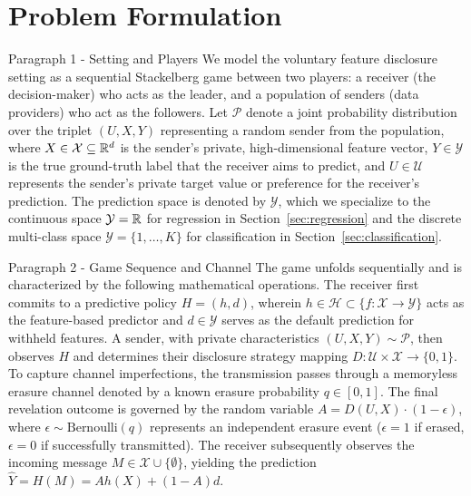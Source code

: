 \section{Problem Formulation}
\label{sec:formulation}

\begin{sourceblock}{Paragraph 1 - Setting and Players}
We model the voluntary feature disclosure setting as a sequential Stackelberg game between two players: a receiver (the decision-maker) who acts as the leader, and a population of senders (data providers) who act as the followers. Let $\mathcal{P}$ denote a joint probability distribution over the triplet $(U, X, Y)$ representing a random sender from the population, where $X \in \mathcal{X} \subseteq \mathbb{R}^d$ is the sender's private, high-dimensional feature vector, $Y \in \mathcal{Y}$ is the true ground-truth label that the receiver aims to predict, and $U \in \mathcal{U}$ represents the sender's private target value or preference for the receiver's prediction. The prediction space is denoted by $\mathcal{Y}$, which we specialize to the continuous space $\mathcal{Y} = \mathbb{R}$ for regression in Section~\ref{sec:regression} and the discrete multi-class space $\mathcal{Y} = \{1, \dots, K\}$ for classification in Section~\ref{sec:classification}.
\end{sourceblock}

\begin{faqblock}
\faqanswers
{}
\end{faqblock}

\begin{sourceblock}{Paragraph 2 - Game Sequence and Channel}
The game unfolds sequentially and is characterized by the following mathematical operations. The receiver first commits to a predictive policy $H = (h, d)$, wherein $h \in \mathcal{H} \subset \{f: \mathcal{X} \to \mathcal{Y}\}$ acts as the feature-based predictor and $d \in \mathcal{Y}$ serves as the default prediction for withheld features. A sender, with private characteristics $(U, X, Y) \sim \mathcal{P}$, then observes $H$ and determines their disclosure strategy mapping $D: \mathcal{U} \times \mathcal{X} \to \{0, 1\}$. To capture channel imperfections, the transmission passes through a memoryless erasure channel denoted by a known erasure probability $q \in [0, 1]$. The final revelation outcome is governed by the random variable $A = D(U, X) \cdot (1 - \epsilon)$, where $\epsilon \sim \text{Bernoulli}(q)$ represents an independent erasure event ($\epsilon = 1$ if erased, $\epsilon = 0$ if successfully transmitted). The receiver subsequently observes the incoming message $M \in \mathcal{X} \cup \{\emptyset\}$, yielding the prediction $\hat{Y} = H(M) = A h(X) + (1-A)d$.
\end{sourceblock}

